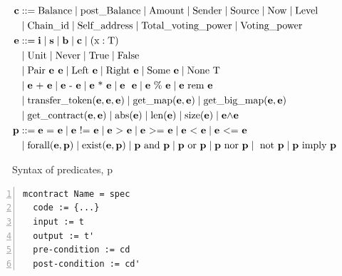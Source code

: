 \documentclass[a4paper,USenglish,cleveref, autoref, thm-restate]{lipics-v2021}
\begin{document}
\begin{figure}[tp]
\begin{align*}
\textbf{c} & ::= 
    \text{Balance}
   \mid \text{post\_Balance}
   \mid \text{Amount}
   \mid \text{Sender}
   \mid \text{Source} 
   \mid \text{Now}
   \mid \text{Level} \\
   &\mid \text{Chain\_id}
   \mid \text{Self\_address}
   \mid \text{Total\_voting\_power}
   \mid \text{Voting\_power} \\
\textbf{e} & :: =  \textbf{i} \mid  \textbf{s}  \mid  \textbf{b} \mid \textbf{c} \mid (\text{x} : \text{T}) \\
&\mid \text{Unit}  \mid \text{Never}  \mid \text{True}  \mid \text{False} \\
&\mid \text{Pair } \textbf{e } \textbf{e}  \mid \text{Left } \textbf{e}  \mid \text{Right } \textbf{e}  \mid \text{Some } \textbf{e} \mid \text{None T}  \\
& \mid \textbf{e} \text{ + } \textbf{e}\mid \textbf{e} \text{ - } \textbf{e}  \mid \textbf{e} \text{ * } \textbf{e} \mid \textbf{e} \text{ \/ } \textbf{e} \mid \textbf{e} \text{ \% } \textbf{e} \mid \textbf{e} \text{ rem } \textbf{e} \\
& \mid \text{transfer\_token} (\textbf{e}, \textbf{e}, \textbf{e}) 
 \mid \text{get\_map} (\textbf{e}, \textbf{e}) 
 \mid \text{get\_big\_map} (\textbf{e}, \textbf{e}) \\
& \mid \text{get\_contract} (\textbf{e}, \textbf{e})  
 \mid \text{abs} (\textbf{e})  
 \mid \text{len} (\textbf{e})
 \mid \text{size} (\textbf{e})
\mid \textbf{e} \text{$\wedge$} \textbf{e}  \\
\textbf{p} & :: = \textbf{e} \text{ = } \textbf{e} 
\mid \textbf{e} \text{ != } \textbf{e}
\mid \textbf{e} \text{ > } \textbf{e}
\mid \textbf{e} \text{ >= } \textbf{e}
\mid \textbf{e} \text{ < } \textbf{e}
\mid \textbf{e} \text{ <= } \textbf{e} \\
&\mid \text{forall} (\textbf{e}, \textbf{p})
                                            \mid \text{exist} (\textbf{e}, \textbf{p})
                                            \mid \textbf{p} \text{ and } \textbf{p}\mid \textbf{p} \text{ or } \textbf{p}  \mid \textbf{p} \text{ nor } \textbf{p} \mid  \text{ not } \textbf{p} \mid \textbf{p} \text{ imply } \textbf{p} \\
\end{align*}
\caption{Syntax of predicates, p}
\label{fig:syntax-predicates}
\end{figure}

\begin{lstlisting}[float=tp,captionpos=b,caption={Smart contract property specification},label={lst:smart-contract-property-specification},numbers=left]
mcontract Name = spec
  code := {...}
  input := t
  output := t'
  pre-condition := cd
  post-condition := cd'
\end{lstlisting}
\end{document}
